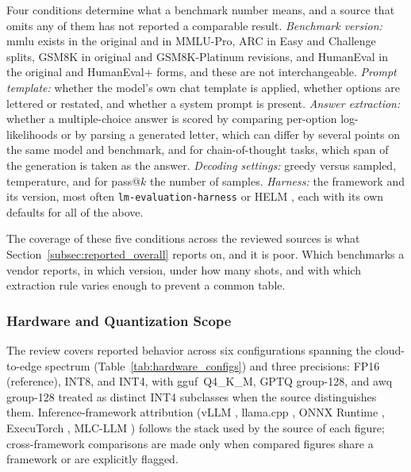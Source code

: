 Four conditions determine what a benchmark number means, and a source that omits
any of them has not reported a comparable result. \emph{Benchmark version:}
\gls{mmlu} exists in the original and in MMLU-Pro, ARC in Easy and Challenge
splits, GSM8K in original and GSM8K-Platinum revisions, and HumanEval in the
original and HumanEval+ forms, and these are not interchangeable.
\emph{Prompt template:} whether the model's own chat template is applied,
whether options are lettered or restated, and whether a system prompt is present.
\emph{Answer extraction:} whether a multiple-choice answer is scored by
comparing per-option log-likelihoods or by parsing a generated letter, which can
differ by several points on the same model and benchmark, and for
chain-of-thought tasks, which span of the generation is taken as the answer.
\emph{Decoding settings:} greedy versus sampled, temperature, and for pass@$k$
the number of samples. \emph{Harness:} the framework and its version, most often
\texttt{lm-evaluation-harness} \citep{gao2023harness} or HELM
\citep{liang2023helm}, each with its own defaults for all of the above.

The coverage of these five conditions across the reviewed sources is what
Section~\ref{subsec:reported_overall} reports on, and it is poor. Which
benchmarks a vendor reports, in which version, under how many shots, and with
which extraction rule varies enough to prevent a common table.

\subsubsection{Hardware and Quantization Scope}
\label{subsec:reported_hardware}
The review covers reported behavior across six configurations spanning the
cloud-to-edge spectrum (Table~\ref{tab:hardware_configs}) and three precisions:
FP16 (reference), INT8, and INT4, with \gls{gguf}~Q4\_K\_M, GPTQ group-128, and \gls{awq}
group-128 treated as distinct INT4 subclasses when the source distinguishes them.
Inference-framework attribution (vLLM \citep{kwon2023vllm}, llama.cpp
\citep{gerganov2023llamacpp}, ONNX Runtime \citep{microsoft2019onnx}, ExecuTorch
\citep{meta2024executorch}, MLC-LLM \citep{mlc2024}) follows the stack used by the
source of each figure; cross-framework comparisons are made only when compared
figures share a framework or are explicitly flagged.

